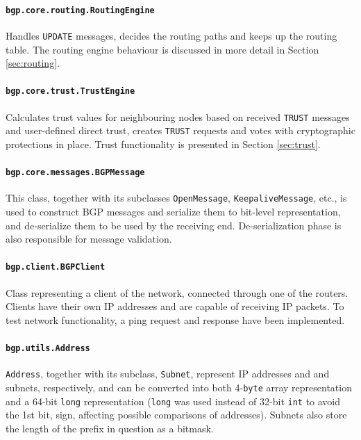 \documentclass[11pt,a4paper,titlepage]{report}
\begin{document}
\paragraph{\texttt{bgp.core.routing.RoutingEngine}}
Handles \texttt{UPDATE} messages, decides the routing paths and keeps up the routing table. The routing engine behaviour is discussed in more detail in Section \ref{sec:routing}.

\paragraph{\texttt{bgp.core.trust.TrustEngine}}
Calculates trust values for neighbouring nodes based on received \texttt{TRUST} messages and user-defined direct trust, creates \texttt{TRUST} requests and votes with cryptographic protections in place. Trust functionality is presented in Section \ref{sec:trust}.

\paragraph{\texttt{bgp.core.messages.BGPMessage}}
This class, together with its subclasses \texttt{OpenMessage}, \texttt{KeepaliveMessage}, etc., is used to construct BGP messages and serialize them to bit-level representation, and de-serialize them to be used by the receiving end. De-serialization phase is also responsible for message validation.

\paragraph{\texttt{bgp.client.BGPClient}}
Class representing a client of the network, connected through one of the routers. Clients have their own IP addresses and are capable of receiving IP packets. To test network functionality, a ping request and response have been implemented.

\paragraph{\texttt{bgp.utils.Address}}
\texttt{Address}, together with its subclass, \texttt{Subnet}, represent IP addresses and and subnets, respectively, and can be converted into both 4-\texttt{byte} array representation and a 64-bit \texttt{long} representation (\texttt{long} was used instead of 32-bit \texttt{int} to avoid the 1st bit, sign, affecting possible comparisons of addresses). Subnets also store the length of the prefix in question as a bitmask.
\end{document}
